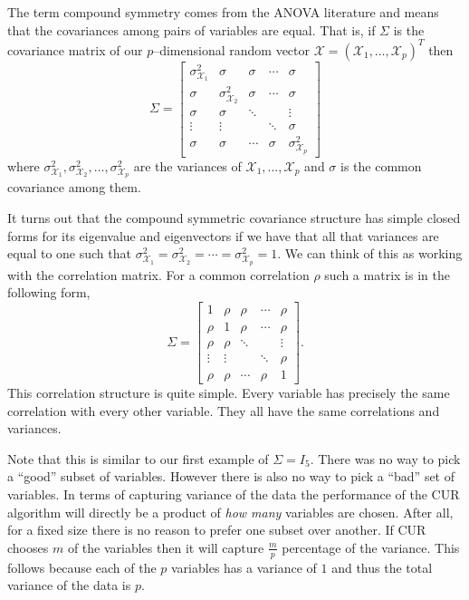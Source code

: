 \documentclass{book}
\newcommand{\bs}[1]{\boldsymbol{#1}}
\newcommand{\rv}[1]{\bs{\mathscr{#1}}}
\begin{document}
The term compound symmetry comes from the ANOVA literature and means that the covariances among pairs of variables are equal. That is, if $\Sigma$ is the covariance matrix of our $p$--dimensional random vector $\rv{X}=(\mathscr{X}_1,\ldots,\mathscr{X}_p)^T$ then 
$$
\Sigma=
\begin{bmatrix}
\sigma_{\mathscr{X}_1}^2& \sigma& \sigma& \cdots& \sigma\\
\sigma& \sigma_{\mathscr{X}_2}^2& \sigma& \cdots& \sigma\\
\sigma& \sigma& \ddots& & \vdots\\
\vdots& \vdots& &\ddots& \sigma\\
\sigma& \sigma& \cdots& \sigma &\sigma_{\mathscr{X}_p}^2
\end{bmatrix}
$$
where $\sigma_{\mathscr{X}_1}^2,\sigma_{\mathscr{X}_2}^2,\ldots,\sigma_{\mathscr{X}_p}^2$ are the variances of $\mathscr{X}_1,\ldots,\mathscr{X}_p$ and $\sigma$ is the common covariance among them. 

It turns out that the compound symmetric covariance structure has simple closed forms for its eigenvalue and eigenvectors if we have that all that variances are equal to one such that $\sigma_{\mathscr{X}_1}^2=\sigma_{\mathscr{X}_2}^2=\cdots=\sigma_{\mathscr{X}_p}^2=1$. We can think of this as working with the correlation matrix. For a common correlation $\rho$ such a matrix is in the following form,
$$
\Sigma=
\begin{bmatrix}
1& \rho& \rho& \cdots& \rho\\
\rho& 1& \rho& \cdots& \rho\\
\rho& \rho& \ddots& & \vdots\\
\vdots& \vdots& &\ddots& \rho\\
\rho& \rho& \cdots& \rho &1
\end{bmatrix}.
$$
This correlation structure is quite simple. Every variable has precisely the same correlation with every other variable. They all have the same correlations and variances.

Note that this is similar to our first example of $\Sigma=I_5$. There was no way to pick a ``good'' subset of variables. However there is also no way to pick a ``bad'' set of variables. In terms of capturing variance of the data the performance of the CUR algorithm will directly be a product of \emph{how many} variables are chosen. After all, for a fixed size there is no reason to prefer one subset over another. If CUR chooses $m$ of the variables then it will capture $\frac{m}{p}$ percentage of the variance. This follows because each of the $p$ variables has a variance of $1$ and thus the total variance of the data is $p$. 
\end{document}
